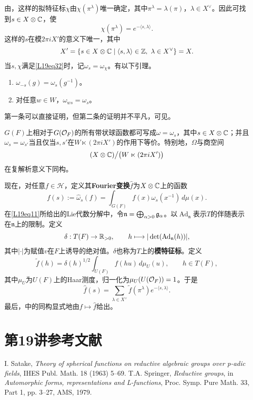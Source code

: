 由，这样的拟特征标$\chi$由$\chi(\pi^\lambda)$唯一确定，其中$\pi^\lambda=\lambda(\pi)$，$\lambda\in X^\vee$。因此可找到$s\in X\otimes\mathbb{C}$，使
\begin{equation}\tag{3.2}\label{L19eq32}\chi(\pi^\lambda)=e^{-\langle s,\lambda\rangle}.\end{equation}
这样的$s$在模$2\pi iX'$的意义下唯一，其中
\[X'=\{s\in X\otimes\mathbb{C}\mid\langle s,\lambda\rangle\in\mathbb{Z},\ \lambda\in X^\vee\}=X.\]
当$s,\chi$满足\eqref{L19eq32}时，记$\omega_s=\omega_\chi$。有以下引理。
\begin{lemma}\label{L19S3O4}
\begin{enumerate}[label=(\arabic*)]
\item $\omega_{-s}(g)=\omega_s(g^{-1})$。
\item 对任意$w\in W$，$\omega_{ws}=\omega_s$。
\end{enumerate}
\end{lemma}
第一条可以直接证明，但第二条的证明并不平凡，可见。
\begin{theorem}\label{L19S3O5}
$G(F)$上相对于$G(\mathcal O_F)$的所有带状球函数都可写成$\omega=\omega_s$，其中$s\in X\otimes\mathbb{C}$；并且$\omega_s=\omega_{s'}$当且仅当$s,s'$在$W\ltimes(2\pi iX')$的作用下等价。特别地，$\Omega$与商空间
\[(X\otimes\mathbb{C})\big/\bigl(W\ltimes(2\pi iX')\bigr)\]
在复解析意义下同构。
\end{theorem}
现在，对任意$f\in\mathcal H$，定义其\textbf{Fourier变换}$\widehat f$为$X\otimes\mathbb{C}$上的函数
\begin{equation}\tag{3.3}\label{L19eq33}\widehat f(s):=\widehat\omega_s(f)=\int_{G(F)}f(x)\omega_s(x^{-1})\,d\mu(x).\end{equation}
在\eqref{L19eq11}所给出的Lie代数分解中，令$\mathfrak n=\bigoplus_{\alpha>0}\mathfrak{g}_\alpha$。以$\operatorname{Ad}_{\mathfrak n}$表示$T$的伴随表示在$\mathfrak n$上的限制。定义
\[\delta:T(F)\to\mathbb{R}_{>0},\qquad h\longmapsto|\det(\operatorname{Ad}_{\mathfrak n}(h))|,\]
其中$|\cdot|$为赋值$v$在$F$上诱导的绝对值。$\delta$也称为$T$上的\textbf{模特征标}。定义
\[\widetilde f(h)=\delta(h)^{1/2}\int_{U(F)}f(hu)\,d\mu_U(u),\qquad h\in T(F),\]
其中$\mu_U$为$U(F)$上的Haar测度，归一化为$\mu_U(U(\mathcal O_F))=1$。于是
\[\widehat f(s)=\sum_{\lambda\in X^\vee}\widetilde f(\pi^\lambda)e^{-\langle s,\lambda\rangle}.\]
最后，中的同构显式地由$f\mapsto\widehat f$给出。
\section{第19讲参考文献}\label{L19S4}
\begin{references}
 I. Satake, \textit{Theory of spherical functions on reductive algebraic groups over p-adic fields}, IHES Publ. Math. 18 (1963) 5--69.
 T.A. Springer, \textit{Reductive groups}, in \textit{Automorphic forms, representations and L-functions}, Proc. Symp. Pure Math. 33, Part 1, pp. 3--27, AMS, 1979.
\end{references}
